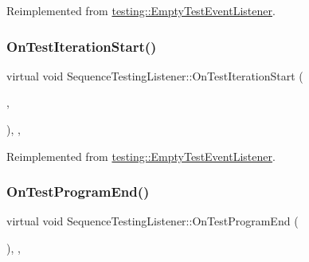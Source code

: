 Reimplemented from \mbox{\hyperlink{classtesting_1_1EmptyTestEventListener_a2253e5a18b3cf7bccd349567a252209d}{testing\+::\+Empty\+Test\+Event\+Listener}}.

\mbox{\label{classSequenceTestingListener_a345641262fa10cc4b251ac54116db74b}} 
\subsubsection{\texorpdfstring{OnTestIterationStart()}{OnTestIterationStart()}}
{\footnotesize\ttfamily virtual void Sequence\+Testing\+Listener\+::\+On\+Test\+Iteration\+Start (\begin{DoxyParamCaption}\item[{const \mbox{\hyperlink{classtesting_1_1UnitTest}{Unit\+Test}} \&}]{,  }\item[{int}]{ }\end{DoxyParamCaption})\hspace{0.3cm}{\ttfamily [inline]}, {\ttfamily [protected]}, {\ttfamily [virtual]}}



Reimplemented from \mbox{\hyperlink{classtesting_1_1EmptyTestEventListener_a836f05829855dc60d13ba99ad712c0dd}{testing\+::\+Empty\+Test\+Event\+Listener}}.

\mbox{\label{classSequenceTestingListener_aacac5e15bac089460841ff63a5c31f57}} 
\subsubsection{\texorpdfstring{OnTestProgramEnd()}{OnTestProgramEnd()}}
{\footnotesize\ttfamily virtual void Sequence\+Testing\+Listener\+::\+On\+Test\+Program\+End (\begin{DoxyParamCaption}\item[{const \mbox{\hyperlink{classtesting_1_1UnitTest}{Unit\+Test}} \&}]{ }\end{DoxyParamCaption})\hspace{0.3cm}{\ttfamily [inline]}, {\ttfamily [protected]}, {\ttfamily [virtual]}}



